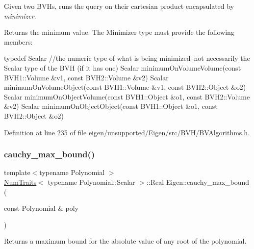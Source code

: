 Given two B\+VH\textquotesingle{}s, runs the query on their cartesian product encapsulated by {\itshape minimizer}. \begin{DoxyReturn}{Returns}
the minimum value. The Minimizer type must provide the following members\+:
\begin{DoxyCode}
\textcolor{keyword}{typedef} Scalar \textcolor{comment}{//the numeric type of what is being minimized--not necessarily the Scalar type of the BVH
       (if it has one)}
Scalar minimumOnVolumeVolume(\textcolor{keyword}{const} BVH1::Volume &v1, \textcolor{keyword}{const} BVH2::Volume &v2)
Scalar minimumOnVolumeObject(\textcolor{keyword}{const} BVH1::Volume &v1, \textcolor{keyword}{const} BVH2::Object &o2)
Scalar minimumOnObjectVolume(\textcolor{keyword}{const} BVH1::Object &o1, \textcolor{keyword}{const} BVH2::Volume &v2)
Scalar minimumOnObjectObject(\textcolor{keyword}{const} BVH1::Object &o1, \textcolor{keyword}{const} BVH2::Object &o2)
\end{DoxyCode}
 
\end{DoxyReturn}


Definition at line \hyperlink{eigen_2unsupported_2_eigen_2src_2_b_v_h_2_b_v_algorithms_8h_source_l00235}{235} of file \hyperlink{eigen_2unsupported_2_eigen_2src_2_b_v_h_2_b_v_algorithms_8h_source}{eigen/unsupported/\+Eigen/src/\+B\+V\+H/\+B\+V\+Algorithms.\+h}.

\mbox{\label{namespace_eigen_ac90ec4513aa09bb8ad54daa209322d03}} 
\subsubsection{\texorpdfstring{cauchy\+\_\+max\+\_\+bound()}{cauchy\_max\_bound()}}
{\footnotesize\ttfamily template$<$typename Polynomial $>$ \\
\hyperlink{group___core___module_struct_eigen_1_1_num_traits}{Num\+Traits}$<$ typename Polynomial\+::\+Scalar $>$\+::Real Eigen\+::cauchy\+\_\+max\+\_\+bound (\begin{DoxyParamCaption}\item[{const Polynomial \&}]{poly }\end{DoxyParamCaption})\hspace{0.3cm}{\ttfamily [inline]}}

\begin{DoxyReturn}{Returns}
a maximum bound for the absolute value of any root of the polynomial.
\end{DoxyReturn}

